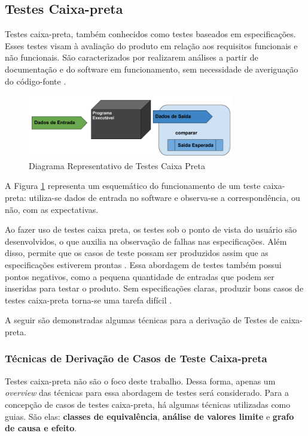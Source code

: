 \subsection{Testes Caixa-preta}
Testes caixa-preta, também conhecidos como testes baseados em especificações. Esses testes visam à avaliação do produto em relação aos requisitos funcionais e não funcionais. São caracterizados por realizarem análises a partir de documentação e do software em funcionamento, sem necessidade de averiguação do código-fonte \cite{barbosaEtAl2009}.

\begin{figure}[h]
  \centering
    \includegraphics[width=0.8\textwidth]{figuras/test_black_box.png}
    \caption{Diagrama Representativo de Testes Caixa Preta}
    \label{test_black_box}
\end{figure}

A Figura \ref{test_black_box} representa um esquemático do funcionamento de um teste caixa-preta: utiliza-se dados de entrada no software e observa-se a correspondência, ou não, com as expectativas.
\par
\indent Ao fazer uso de testes caixa preta, os testes sob o ponto de vista do usuário são desenvolvidos, o que auxilia na observação de falhas nas especificações. Além disso, permite que os casos de teste possam ser produzidos assim que as especificações estiverem prontas \cite{stf2010}. Essa abordagem de testes também possui pontos negativos, como a pequena quantidade de entradas que podem ser inseridas para testar o produto. Sem especificações claras, produzir bons casos de testes caixa-preta torna-se uma tarefa difícil \cite{stf2010}.
\par
\indent A seguir são demonstradas algumas técnicas para a derivação de Testes de caixa-preta.

\subsubsection{Técnicas de Derivação de Casos de Teste Caixa-preta}
Testes caixa-preta não são o foco deste trabalho. Dessa forma, apenas um \textit{overview} das técnicas para essa abordagem de testes será considerado. Para a concepção de casos de testes caixa-preta, há algumas técnicas utilizadas como guias. São elas: \textbf{classes de equivalência}, \textbf{análise de valores limite} e \textbf{grafo de causa e efeito}.

